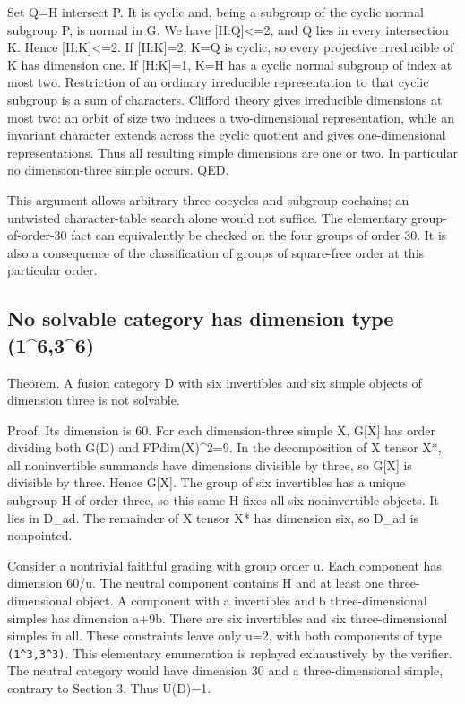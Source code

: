 Set Q=H intersect P. It is cyclic and, being a subgroup of the cyclic
normal subgroup P, is normal in G. We have {[}H:Q{]}\textless=2, and Q
lies in every intersection K. Hence {[}H:K{]}\textless=2. If
{[}H:K{]}=2, K=Q is cyclic, so every projective irreducible of K has
dimension one. If {[}H:K{]}=1, K=H has a cyclic normal subgroup of index
at most two. Restriction of an ordinary irreducible representation to
that cyclic subgroup is a sum of characters. Clifford theory gives
irreducible dimensions at most two: an orbit of size two induces a
two-dimensional representation, while an invariant character extends
across the cyclic quotient and gives one-dimensional representations.
Thus all resulting simple dimensions are one or two. In particular no
dimension-three simple occurs. QED.

This argument allows arbitrary three-cocycles and subgroup cochains; an
untwisted character-table search alone would not suffice. The elementary
group-of-order-30 fact can equivalently be checked on the four groups of
order 30. It is also a consequence of the classification of groups of
square-free order at this particular order.

\hypertarget{no-solvable-category-has-dimension-type-1636}{%
\subsection{No solvable category has dimension type
(1\^{}6,3\^{}6)}\label{no-solvable-category-has-dimension-type-1636}}

Theorem. A fusion category D with six invertibles and six simple objects
of dimension three is not solvable.

Proof. Its dimension is 60. For each dimension-three simple X, G{[}X{]}
has order dividing both \textbar G(D) and FPdim(X)\^{}2=9. In
the decomposition of X tensor X*, all noninvertible summands have
dimensions divisible by three, so \textbar G{[}X{]}\textbar{} is
divisible by three. Hence \textbar G{[}X{]}. The group of six
invertibles has a unique subgroup H of order three, so this same H fixes
all six noninvertible objects. It lies in D\_ad. The remainder of X
tensor X* has dimension six, so D\_ad is nonpointed.

Consider a nontrivial faithful grading with group order u. Each
component has dimension 60/u. The neutral component contains H and at
least one three-dimensional object. A component with a invertibles and b
three-dimensional simples has dimension a+9b. There are six invertibles
and six three-dimensional simples in all. These constraints leave only
u=2, with both components of type
\texttt{(1\textasciicircum{}3,3\allowbreak{}\textasciicircum{}3)}. This
elementary enumeration is replayed exhaustively by the verifier. The
neutral category would have dimension 30 and a three-dimensional simple,
contrary to Section 3. Thus U(D)=1.

